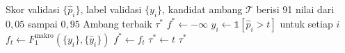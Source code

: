 \begin{algorithm}[htbp]
  \caption{Pencarian Ambang Keputusan $\tau$ pada Data Validasi}
  \label{alg:pencarian-ambang}
  \begin{algorithmic}[1]
    \Require Skor validasi $\{\hat{p}_i\}$, label validasi $\{y_i\}$, kandidat ambang $\mathcal{T}$ berisi 91 nilai dari $0{,}05$ sampai $0{,}95$
    \Ensure Ambang terbaik $\tau^{*}$
    \State $f^{*} \gets -\infty$
      \State $\hat{y}_i \gets \mathbb{1}[\hat{p}_i > t]$ untuk setiap $i$
      \State $f_t \gets F_1^{\text{makro}}(\{y_i\}, \{\hat{y}_i\})$
        \State $f^{*} \gets f_t$
        \State $\tau^{*} \gets t$
      \EndIf
    \EndFor
    \State \Return $\tau^{*}$
  \end{algorithmic}
\end{algorithm}